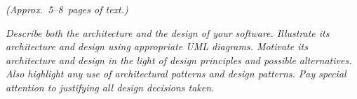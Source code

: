 \flushleft
\emph{(Approx.~5--8~pages of text.)}

\emph{Describe both the architecture and the design of your 
software. Illustrate its architecture and design using appropriate UML diagrams. 
Motivate its architecture and design in the light of design principles and 
possible alternatives. Also highlight any use of architectural 
patterns and design patterns. Pay special attention to justifying all design 
decisions taken.}

